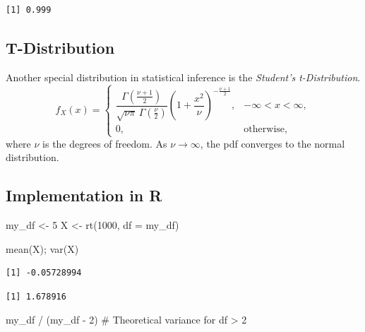 \documentclass[
  letterpaper,
  DIV=11,
  numbers=noendperiod]{scrreprt}
\newenvironment{Shaded}{\begin{snugshade}}{\end{snugshade}}
\newcommand{\AttributeTok}[1]{\textcolor[rgb]{0.40,0.45,0.13}{#1}}
\newcommand{\CommentTok}[1]{\textcolor[rgb]{0.37,0.37,0.37}{#1}}
\newcommand{\DecValTok}[1]{\textcolor[rgb]{0.68,0.00,0.00}{#1}}
\newcommand{\FunctionTok}[1]{\textcolor[rgb]{0.28,0.35,0.67}{#1}}
\newcommand{\NormalTok}[1]{\textcolor[rgb]{0.00,0.23,0.31}{#1}}
\newcommand{\OtherTok}[1]{\textcolor[rgb]{0.00,0.23,0.31}{#1}}
\newcommand{\SpecialCharTok}[1]{\textcolor[rgb]{0.37,0.37,0.37}{#1}}
\begin{document}
\begin{verbatim}
[1] 0.999
\end{verbatim}

\subsection{T-Distribution}\label{t-distribution}

Another special distribution in statistical inference is the
\emph{Student's t-Distribution}. \[f_X(x) =
\begin{cases}
\dfrac{\Gamma\!\left(\tfrac{\nu+1}{2}\right)}
{\sqrt{\nu \pi}\,\Gamma\!\left(\tfrac{\nu}{2}\right)}
\left(1 + \dfrac{x^2}{\nu}\right)^{-\tfrac{\nu+1}{2}}, & -\infty < x < \infty, \\[2ex]
0, & \text{otherwise},
\end{cases}\] where \(\nu\) is the degrees of freedom. As
\(\nu \to \infty\), the pdf converges to the normal distribution.

\subsection{Implementation in R}\label{implementation-in-r-9}

\begin{Shaded}
\begin{Highlighting}[]
\NormalTok{my\_df }\OtherTok{\textless{}{-}} \DecValTok{5}
\NormalTok{X }\OtherTok{\textless{}{-}} \FunctionTok{rt}\NormalTok{(}\DecValTok{1000}\NormalTok{, }\AttributeTok{df =}\NormalTok{ my\_df)}

\FunctionTok{mean}\NormalTok{(X); }\FunctionTok{var}\NormalTok{(X)}
\end{Highlighting}
\end{Shaded}

\begin{verbatim}
[1] -0.05728994
\end{verbatim}

\begin{verbatim}
[1] 1.678916
\end{verbatim}

\begin{Shaded}
\begin{Highlighting}[]
\NormalTok{my\_df }\SpecialCharTok{/}\NormalTok{ (my\_df }\SpecialCharTok{{-}} \DecValTok{2}\NormalTok{)   }\CommentTok{\# Theoretical variance for df \textgreater{} 2}
\end{Highlighting}
\end{Shaded}
\end{document}
